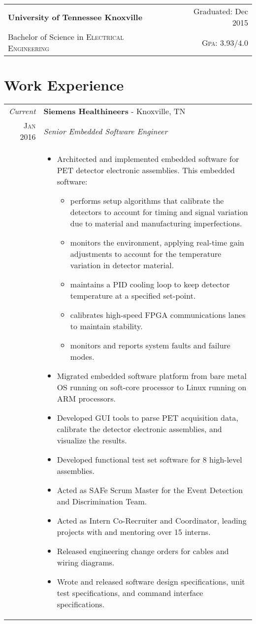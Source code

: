 \documentclass[a4paper,11pt]{article}
\begin{document}
\begin{tabularx}{\textwidth}{lXr}
   \textbf{University of Tennessee Knoxville} &  & Graduated: Dec 2015\\
   Bachelor of Science in \textsc{Electrical Engineering} &  & \normalsize \textsc{Gpa}: 3.93/4.0\\
\end{tabularx}

\hfill
\section{Work Experience}
\begin{tabularx}{\textwidth}{R|X}
   \emph{Current} & \textbf{Siemens Healthineers} \-- Knoxville, TN\\
   \textsc{Jan 2016} & \emph{Senior Embedded Software Engineer}\\
   & \small{
      \begin{itemize}[leftmargin=20pt,topsep=1pt,itemsep=1pt,partopsep=0pt, parsep=1pt]
         \item Architected and implemented embedded software for PET detector electronic assemblies. This embedded software:
         \begin{itemize}
         	\item performs setup algorithms that calibrate the detectors to account for timing and signal variation due to material and manufacturing imperfections.
		\item monitors the environment, applying real-time gain adjustments to account for the temperature variation in detector material.
		\item maintains a PID cooling loop to keep detector temperature at a specified set-point.
		\item calibrates high-speed FPGA communications lanes to maintain stability.
		\item monitors and reports system faults and failure modes.
         \end{itemize}
         \item Migrated embedded software platform from bare metal OS running on soft-core processor to Linux running on ARM processors.
         \item Developed GUI tools to parse PET acquisition data, calibrate the detector electronic assemblies, and visualize the results.
         \item Developed functional test set software for 8 high-level assemblies.
         \item Acted as SAFe Scrum Master for the Event Detection and Discrimination Team.
         \item Acted as Intern Co-Recruiter and Coordinator, leading projects with and mentoring over 15 interns.
         \item Released engineering change orders for cables and wiring diagrams.
         \item Wrote and released software design specifications, unit test specifications, and command interface specifications.
         

\end{itemize}}
\end{tabularx}
\end{document}
